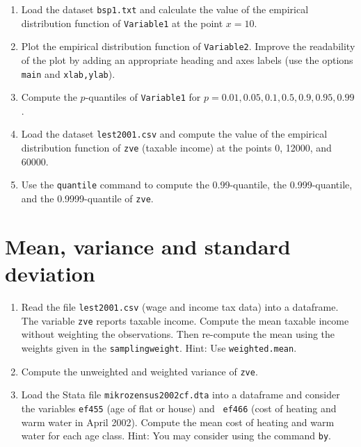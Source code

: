 \documentclass{article}
\begin{document}
\begin{enumerate}
\item Load the dataset \texttt{bsp1.txt} and calculate the value of the
empirical distribution function of \texttt{Variable1} at the point $x=10.$

\item Plot the empirical distribution function of \texttt{Variable2}.
Improve the readability of the plot by adding an appropriate heading and
axes labels (use the options \texttt{main} and \texttt{xlab,ylab}).

\item Compute the $p$-quantiles of \texttt{Variable1} for $%
p=0.01,0.05,0.1,0.5,0.9,0.95,0.99$.

\item Load the dataset \texttt{lest2001.csv} and compute the value of the
empirical distribution function of \texttt{zve} (taxable income) at the
points 0, 12000, and 60000.

\item Use the \texttt{quantile} command to compute the 0.99-quantile, the
0.999-quantile, and the 0.9999-quantile of \texttt{zve}.


\end{enumerate}
\newpage


\section{Mean, variance and standard deviation}

\begin{enumerate}
\item Read the file \texttt{lest2001.csv} (wage and income tax data) into a
dataframe. The variable \texttt{zve} reports taxable income. Compute the
mean taxable income without weighting the observations. Then re-compute the
mean using the weights given in the \texttt{samplingweight}. Hint: Use 
\texttt{weighted.mean}.

\item Compute the unweighted and weighted variance of \texttt{zve}.

\item Load the Stata file \texttt{mikrozensus2002cf.dta} into a dataframe
and consider the variables \texttt{ef455} (age of flat or house) and \texttt{%
ef466} (cost of heating and warm water in April 2002). Compute the mean cost
of heating and warm water for each age class. Hint: You may consider using
the command \texttt{by}.
\end{enumerate}
\newpage
\end{document}

